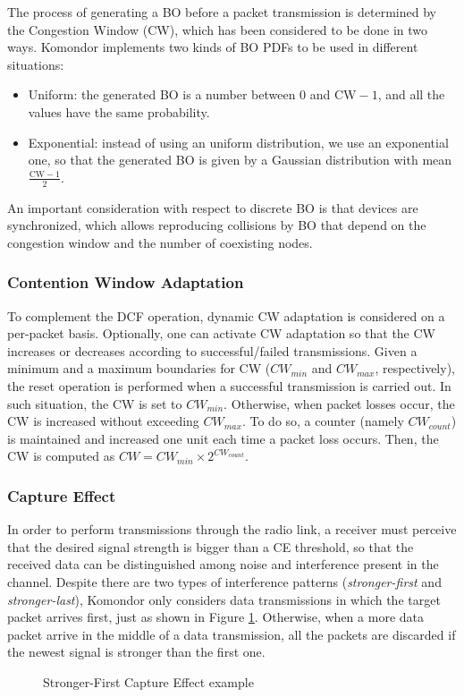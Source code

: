 \documentclass[a4paper]{article}
\begin{document}
		The process of generating a BO before a packet transmission is determined by the Congestion Window (CW), which has been considered to be done in two ways. Komondor implements two kinds of BO PDFs to be used in different situations:
		\begin{itemize}
			\item Uniform: the generated BO is a number between 0 and $\text{CW}-1$, and all the values have the same probability.
			\item Exponential: instead of using an uniform distribution, we use an exponential one, so that the generated BO is given by a Gaussian distribution with mean $\frac{\text{CW}-1}{2}$.
		\end{itemize}
				
		An important consideration with respect to discrete BO is that devices are synchronized, which allows reproducing collisions by BO that depend on the congestion window and the number of coexisting nodes.
		
		\subsubsection{Contention Window Adaptation}
		\label{section:cw_adaptation}
		To complement the DCF operation, dynamic CW adaptation is considered on a per-packet basis. Optionally, one can activate CW adaptation so that the CW increases or decreases according to successful/failed transmissions. Given a minimum and a maximum boundaries for CW ($CW_{min}$ and $CW_{max}$, respectively), the reset operation is performed when a successful transmission is carried out. In such situation, the CW is set to $CW_{min}$. Otherwise, when packet losses occur, the CW is increased without exceeding $CW_{max}$. To do so, a counter (namely $CW_{count}$) is maintained and increased one unit each time a packet loss occurs. Then, the CW is computed as $CW = CW_{min} \times 2^{CW_{count}}$.
		
		\subsubsection{Capture Effect}
		\label{section:capture_effect}
		In order to perform transmissions through the radio link, a receiver must perceive that the desired signal strength is bigger than a CE threshold, so that the received data can be distinguished among noise and interference present in the channel. Despite there are two types of interference patterns (\emph{stronger-first} and \emph{stronger-last}), Komondor only considers data transmissions in which the target packet arrives first, just as shown in Figure \ref{fig:capture_effect}. Otherwise, when a more data packet arrive in the middle of a data transmission, all the packets are discarded if the newest signal is stronger than the first one.
		\begin{figure}[h!]
			\centering
			\caption{Stronger-First Capture Effect example}
			\label{fig:capture_effect}
		\end{figure}
	
\end{document}
